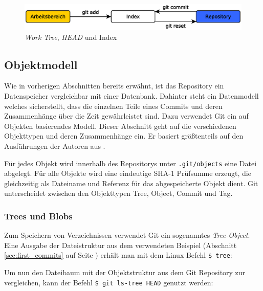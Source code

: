 \begin{figure}[h]
    \centering
    \includegraphics[scale=0.60]{images/trees.eps}
    \caption{\textit{Work Tree}, \textit{HEAD} und Index\cite[34]{gitosp}}
    \label{fig:trees}
\end{figure}

\subsection{Objektmodell}\label{sec:objectmodel}
Wie in vorherigen Abschnitten bereits erwähnt, ist das Repository ein
Datenspeicher vergleichbar mit einer Datenbank. Dahinter steht ein Datenmodell
welches sicherstellt, dass die einzelnen Teile eines Commits und deren
Zusammenhänge über die Zeit gewährleistet sind. Dazu verwendet Git ein auf
Objekten basierendes Modell. Dieser Abschnitt geht auf die verschiedenen
Objekttypen und deren Zusammenhänge ein. Er basiert größtenteils auf den
Ausführungen der Autoren aus \cite[S.~49-59]{gitosp}.

Für jedes Objekt wird innerhalb des Repositorys unter \texttt{.git/objects}
eine Datei abgelegt. Für alle Objekte wird eine eindeutige \gls{SHA-1}
Prüfsumme erzeugt, die gleichzeitig als Dateiname und Referenz für das
abgespeicherte Objekt dient. Git unterscheidet zwischen den Objekttypen Tree,
Object, Commit und Tag.

\subsubsection{Trees und Blobs}\label{sec:treeblobobjects}
Zum Speichern von Verzeichnissen verwendet Git ein sogenanntes
\textit{Tree-Object}. Eine Ausgabe der Dateistruktur aus dem verwendeten
Beispiel (Abschnitt \ref{sec:first_commits} auf Seite
\pageref{sec:first_commits}) erhält man mit dem Linux Befehl \texttt{\$ tree}:



Um nun den Dateibaum mit der Objektstruktur aus dem Git Repository zur
vergleichen, kann der Befehl \texttt{\$ git ls-tree HEAD} genutzt werden:



